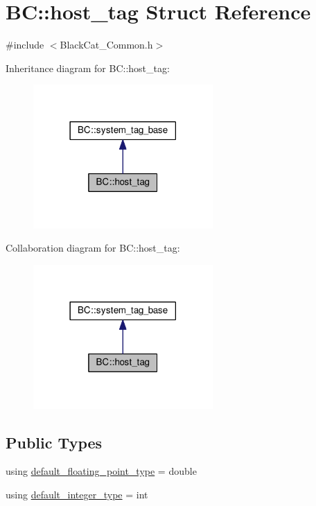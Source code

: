 \hypertarget{structBC_1_1host__tag}{}\section{BC\+:\+:host\+\_\+tag Struct Reference}
\label{structBC_1_1host__tag}


{\ttfamily \#include $<$Black\+Cat\+\_\+\+Common.\+h$>$}



Inheritance diagram for BC\+:\+:host\+\_\+tag\+:
\nopagebreak
\begin{figure}[H]
\begin{center}
\leavevmode
\includegraphics[width=194pt]{structBC_1_1host__tag__inherit__graph}
\end{center}
\end{figure}


Collaboration diagram for BC\+:\+:host\+\_\+tag\+:
\nopagebreak
\begin{figure}[H]
\begin{center}
\leavevmode
\includegraphics[width=194pt]{structBC_1_1host__tag__coll__graph}
\end{center}
\end{figure}
\subsection*{Public Types}
\begin{DoxyCompactItemize}
\item 
using \hyperlink{structBC_1_1host__tag_adda3346115c9b8bd51b8d876c4138399}{default\+\_\+floating\+\_\+point\+\_\+type} = double
\item 
using \hyperlink{structBC_1_1host__tag_abb939b426fa8dfb7c63f593e7ee66d62}{default\+\_\+integer\+\_\+type} = int
\end{DoxyCompactItemize}


